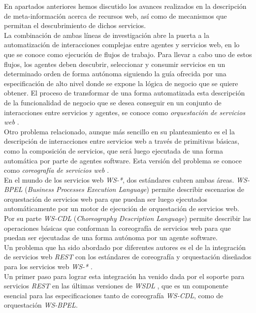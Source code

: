 En apartados anteriores hemos discutido los avances realizados en la descripci\'on de meta-informaci\'on acerca de recursos web, as\'i como de mecanismos que permitan el descubrimiento de dichos servicios. \\
La combinaci\'on de ambas l\'ineas de investigaci\'on abre la puerta a la automatizaci\'on de interacciones complejas entre agentes y servicios web, en lo que se conoce como ejecuci\'on de flujos de trabajo. Para llevar a cabo uno de estos flujos, los agentes deben descubrir, seleccionar y consumir servicios en un determinado orden de forma aut\'onoma siguiendo la gu\'ia ofrecida por una especificaci\'on de alto nivel donde se expone la l\'ogica de negocio que se quiere obtener. El proceso de transformar de una forma automatizada esta descripci\'on de la funcionalidad de negocio que se desea conseguir en un conjunto de interacciones entre servicios y agentes, se conoce como \textit{orquestaci\'on de servicios web} \cite{orchestration_choreography}.\\
Otro problema relacionado, aunque m\'as sencillo en su planteamiento es el la descripci\'on de interacciones entre servicios web a trav\'es de primitivas b\'asicas, como la composici\'on de servicios, que ser\'a luego ejecutada de una forma autom\'atica por parte de agentes software. Esta versi\'on del problema se conoce como \textit{coreograf\'ia de servicios web} \cite{orchestration_choreography}.\\
En el mundo de los servicios web \textit{WS-*}, dos est\'andares cubren ambas \'areas. \textit{WS-BPEL} (\textit{Business Processes Execution Language}) \cite{wsbpel} permite describir escenarios de orquestaci\'on de servicios web para que puedan ser luego ejecutados autom\'aticamente por un motor de ejecuci\'on de orquestaci\'on de servicios web. Por su parte \textit{WS-CDL} (\textit{Choreography Description Language}) \cite{wscdl} permite describir las operaciones b\'asicas que conforman la coreograf\'ia de servicios web para que puedan ser ejecutadas de una forma aut\'onoma por un agente software.\\
Un problema que ha sido abordado por diferentes autores es el de la integraci\'on de servicios web \textit{REST} con los est\'andares de coreograf\'ia y orquestaci\'on dise\~nados para los servicios web \textit{WS-*} \cite{zur2005developing}.\\
Un primer paso para lograr esta integraci\'on ha venido dada por el soporte para servicios \textit{REST} en las \'ultimas versiones de \textit{WSDL} \cite{takase2008definition}, que es un componente esencial para las especificaciones tanto de coreograf\'ia \textit{WS-CDL}, como de orquestaci\'on \textit{WS-BPEL}.\\

